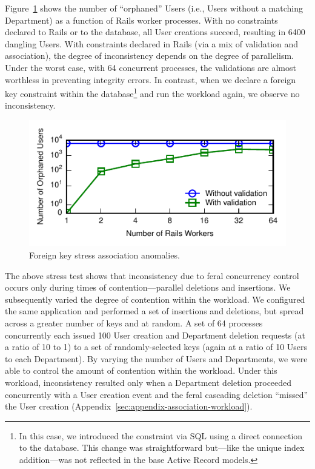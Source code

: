 Figure~\ref{fig:fk-stress} shows the number of ``orphaned'' Users
(i.e., Users without a matching Department) as a function of Rails
worker processes. With no constraints declared to Rails or to the
database, all User creations succeed, resulting in 6400 dangling
Users. With constraints declared in Rails (via a mix of validation and
association), the degree of inconsistency depends on the degree of
parallelism. Under the worst case, with 64 concurrent processes, the
validations are almost worthless in preventing integrity errors. In
contrast, when we declare a foreign key constraint within the
database\footnote{In this case, we introduced the constraint via SQL
  using a direct connection to the database. This change was
  straightforward but---like the unique index addition---was not
  reflected in the base Active Record models.}  and run the workload
again, we observe no inconsistency.

\begin{figure}
\includegraphics[width=\columnwidth]{figs/fk-stress-violations.pdf}\vspace{-1.5em}
\caption{Foreign key stress association anomalies.}\vspace{-.5em}
\label{fig:fk-stress}
\end{figure}

The above stress test shows that inconsistency due to feral
concurrency control occurs only during times of contention---parallel
deletions and insertions. We subsequently varied the degree of
contention within the workload. We configured the same application and
performed a set of insertions and deletions, but spread across a
greater number of keys and at random. A set of 64 processes
concurrently each issued 100 User creation and Department deletion
requests (at a ratio of 10 to 1) to a set of randomly-selected keys
(again at a ratio of 10 Users to each Department). By varying the
number of Users and Departments, we were able to control the amount of
contention within the workload. Under this workload, inconsistency
resulted only when a Department deletion proceeded concurrently with a
User creation event and the feral cascading deletion ``missed'' the
User creation (Appendix~\ref{sec:appendix-association-workload}).

